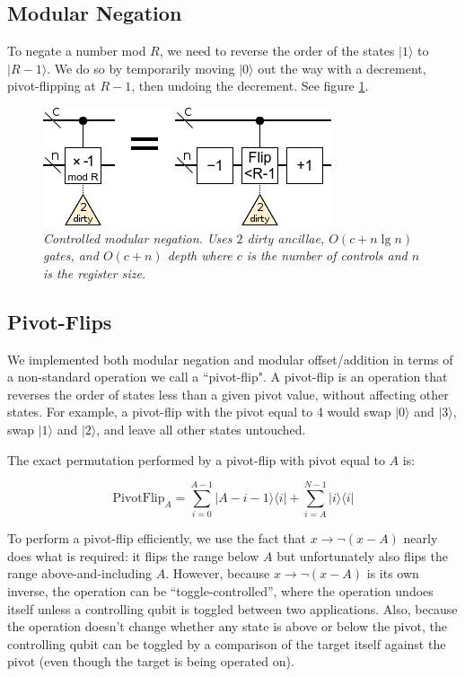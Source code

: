 \documentclass[twocolumn]{article}
\begin{document}
\subsection{Modular Negation}

To negate a number mod $R$, we need to reverse the order of the states $|1\rangle$ to $|R-1\rangle$.
We do so by temporarily moving $|0\rangle$ out the way with a decrement, pivot-flipping at $R-1$, then undoing the decrement.
See figure \ref{fig:negate-mod}.

\begin{figure}
  \centering
  \includegraphics[width=\linewidth]{assets/negate-mod.png}
  \caption{\em
    Controlled modular negation.
    Uses $2$ dirty ancillae, $O(c + n \lg n)$ gates, and $O(c + n)$ depth where $c$ is the number of controls and $n$ is the register size.
  }
  \label{fig:negate-mod}
\end{figure}


\subsection{Pivot-Flips} \label{sec:pivot-flips}

We implemented both modular negation and modular offset/addition in terms of a non-standard operation we call a ``pivot-flip".
A pivot-flip is an operation that reverses the order of states less than a given pivot value, without affecting other states.
For example, a pivot-flip with the pivot equal to 4 would swap $|0\rangle$ and $|3\rangle$, swap $|1\rangle$ and $|2\rangle$, and leave all other states untouched.

The exact permutation performed by a pivot-flip with pivot equal to $A$ is:

$$\text{PivotFlip}_A = \sum_{i=0}^{A-1} |A-i-1\rangle \langle i| + \sum_{i=A}^{N-1} |i\rangle \langle i|$$

To perform a pivot-flip efficiently, we use the fact that $x \rightarrow \lnot(x - A)$ nearly does what is required: it flips the range below $A$ but unfortunately also flips the range above-and-including $A$.
However, because $x \rightarrow \lnot(x - A)$ is its own inverse, the operation can be ``toggle-controlled'', where the operation undoes itself unless a controlling qubit is toggled between two applications.
Also, because the operation doesn't change whether any state is above or below the pivot, the controlling qubit can be toggled by a comparison of the target itself against the pivot (even though the target is being operated on).
\end{document}
